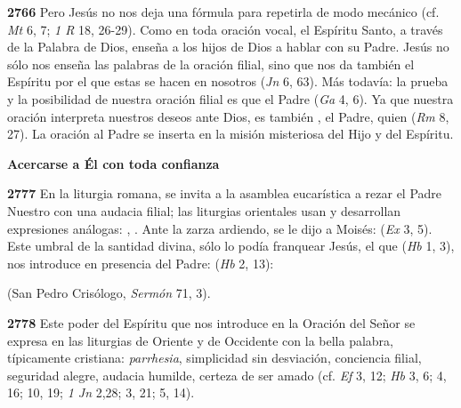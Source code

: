 \begin{body}
\begin{body}
\textbf{2766} Pero Jesús no nos deja una fórmula para repetirla de modo mecánico (cf. \emph{Mt} 6, 7; \emph{1 R} 18, 26-29). Como en toda oración vocal, el Espíritu Santo, a través de la Palabra de Dios, enseña a los hijos de Dios a hablar con su Padre. Jesús no sólo nos enseña las palabras de la oración filial, sino que nos da también el Espíritu por el que estas se hacen en nosotros  (\emph{Jn} 6, 63). Más todavía: la prueba y la posibilidad de nuestra oración filial es que el Padre  (\emph{Ga} 4, 6). Ya que nuestra oración interpreta nuestros deseos ante Dios, es también , el Padre, quien  (\emph{Rm} 8, 27). La oración al Padre se inserta en la misión misteriosa del Hijo y del Espíritu.

\textbf{Acercarse a Él con toda confianza}

\textbf{2777} En la liturgia romana, se invita a la asamblea eucarística a rezar el Padre Nuestro con una audacia filial; las liturgias orientales usan y desarrollan expresiones análogas: , . Ante la zarza ardiendo, se le dijo a Moisés:  (\emph{Ex} 3, 5). Este umbral de la santidad divina, sólo lo podía franquear Jesús, el que  (\emph{Hb} 1, 3), nos introduce en presencia del Padre:  (\emph{Hb} 2, 13):

 (San Pedro Crisólogo, \emph{Sermón} 71, 3).

\textbf{2778} Este poder del Espíritu que nos introduce en la Oración del Señor se expresa en las liturgias de Oriente y de Occidente con la bella palabra, típicamente cristiana: \emph{parrhesia}, simplicidad sin desviación, conciencia filial, seguridad alegre, audacia humilde, certeza de ser amado (cf. \emph{Ef} 3, 12; \emph{Hb} 3, 6; 4, 16; 10, 19; \emph{1 Jn} 2,28; 3, 21; 5, 14).


\end{body}
\end{body}
